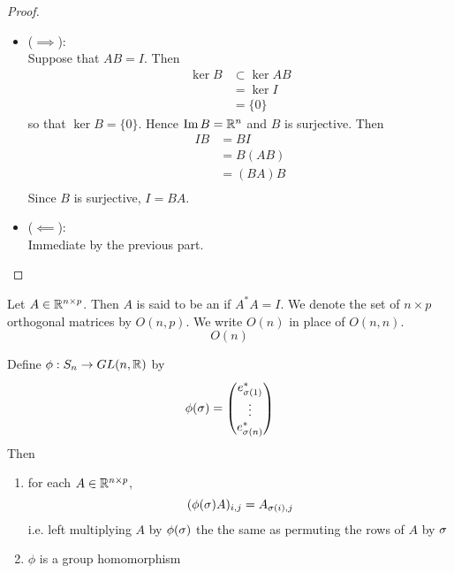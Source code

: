 \documentclass{book}
\begin{document}
	\begin{proof}\
		\begin{itemize}
			\item ($\implies$): \\
			Suppose that $AB = I$. Then  
			\begin{align*}
				\ker B 
				& \subset \ker AB \\
				& = \ker I \\
				& = \{0\}
			\end{align*}
			so that $\ker B = \{0\}$. Hence $\text{Im} \, B = \mathbb{R}^n$ and $B$ is surjective. Then 
			\begin{align*}
				I B
				& = BI \\
				& = B(AB) \\
				& = (BA) B \\
			\end{align*}
			Since $B$ is surjective, $I = BA$. 
			\item ($\impliedby$): \\
			Immediate by the previous part.
		\end{itemize}
	\end{proof}

	\begin{defn} 
		Let $A \in \mathbb{R}^{n \times p}$. Then $A$ is said to be an  if $A^*A = I$. We denote the set of $n \times p$ orthogonal matrices by $O(n, p)$. We write $O(n)$ in place of $O(n, n)$.
		$$O(n)$$
	\end{defn}

	\begin{ex}  
		Define $\phi: S_n \rightarrow GL(n, \mathbb{R})$ by 
		$$\phi(\sigma) = 
		\begin{pmatrix}
			e_{\sigma(1)}^* \\
			\vdots \\
			e_{\sigma(n)}^*
		\end{pmatrix}
		$$
		Then 
		\begin{enumerate}
			\item for each $A \in \mathbb{R}^{n \times p}$, 
			$$ (\phi(\sigma) A)_{i,j}	= A_{\sigma(i), j} $$
			i.e. left multiplying $A$ by $\phi(\sigma)$ the the same as permuting the rows of $A$ by $\sigma$
			\item $\phi$ is a group homomorphism
		\end{enumerate}
	\end{ex}
\end{document}
